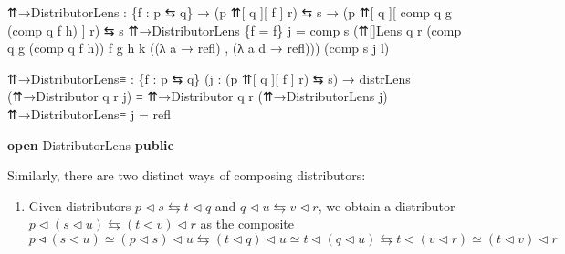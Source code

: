 \documentclass[
  11pt,
  oneside,
  article]{memoir}
\newenvironment{Shaded}{}{}
\newcommand{\KeywordTok}[1]{\textcolor[rgb]{0.00,0.44,0.13}{\textbf{#1}}}
\newcommand{\NormalTok}[1]{#1}
\newcommand{\OtherTok}[1]{\textcolor[rgb]{0.00,0.44,0.13}{#1}}
\providecommand{\tightlist}{%
  \setlength{\itemsep}{0pt}\setlength{\parskip}{0pt}}
\theoremstyle{definition}
\theoremstyle{plain}
\newcommand{\0}{\textsf{0}}
\newcommand{\1}{\tn{\textsf{1}}}
\begin{document}
\begin{Shaded}
\begin{Highlighting}[]
\NormalTok{    ⇈→DistributorLens }\OtherTok{:} \OtherTok{\{}\NormalTok{f }\OtherTok{:}\NormalTok{ p ⇆ q}\OtherTok{\}} \OtherTok{→} \OtherTok{(}\NormalTok{p ⇈[ q ][ f ] r}\OtherTok{)}\NormalTok{ ⇆ s }
                        \OtherTok{→} \OtherTok{(}\NormalTok{p\textquotesingle{} ⇈[ q\textquotesingle{} ][ comp q\textquotesingle{} g }\OtherTok{(}\NormalTok{comp q\textquotesingle{} f h}\OtherTok{)}\NormalTok{ ] r\textquotesingle{}}\OtherTok{)}\NormalTok{ ⇆ s\textquotesingle{}}
\NormalTok{    ⇈→DistributorLens }\OtherTok{\{}\NormalTok{f }\OtherTok{=}\NormalTok{ f}\OtherTok{\}}\NormalTok{ j }\OtherTok{=} 
\NormalTok{        comp s\textquotesingle{} }\OtherTok{(}\NormalTok{⇈[]Lens q\textquotesingle{} r }\OtherTok{(}\NormalTok{comp q\textquotesingle{} g }\OtherTok{(}\NormalTok{comp q\textquotesingle{} f h}\OtherTok{))}\NormalTok{ f }
\NormalTok{                         g h k }\OtherTok{((λ}\NormalTok{ a }\OtherTok{→}\NormalTok{ refl}\OtherTok{)}\NormalTok{ , }\OtherTok{(λ}\NormalTok{ a d }\OtherTok{→}\NormalTok{ refl}\OtherTok{)))} 
             \OtherTok{(}\NormalTok{comp s\textquotesingle{} j l}\OtherTok{)}

\NormalTok{    ⇈→DistributorLens≡ }\OtherTok{:} \OtherTok{\{}\NormalTok{f }\OtherTok{:}\NormalTok{ p ⇆ q}\OtherTok{\}} \OtherTok{(}\NormalTok{j }\OtherTok{:} \OtherTok{(}\NormalTok{p ⇈[ q ][ f ] r}\OtherTok{)}\NormalTok{ ⇆ s}\OtherTok{)}
                         \OtherTok{→}\NormalTok{ distrLens }\OtherTok{(}\NormalTok{⇈→Distributor q r j}\OtherTok{)} 
\NormalTok{                           ≡ ⇈→Distributor q\textquotesingle{} r\textquotesingle{} }\OtherTok{(}\NormalTok{⇈→DistributorLens j}\OtherTok{)}
\NormalTok{    ⇈→DistributorLens≡ j }\OtherTok{=}\NormalTok{ refl}

\KeywordTok{open}\NormalTok{ DistributorLens }\KeywordTok{public}
\end{Highlighting}
\end{Shaded}

Similarly, there are two distinct ways of composing distributors:

\begin{enumerate}
\def\labelenumi{\arabic{enumi}.}
\tightlist
\item
  Given distributors
  \(p \triangleleft s \leftrightarrows t \triangleleft q\) and
  \(q \triangleleft u \leftrightarrows v \triangleleft r\), we obtain a
  distributor
  \(p \triangleleft (s \triangleleft u) \leftrightarrows (t \triangleleft v) \triangleleft r\)
  as the composite \[
  p ◃ (s \triangleleft u) \simeq (p \triangleleft s) \triangleleft u \leftrightarrows (t \triangleleft q) \triangleleft u \simeq t \triangleleft (q \triangleleft u) \leftrightarrows t \triangleleft (v \triangleleft r) \simeq (t \triangleleft v) \triangleleft r
  \]
\end{enumerate}
\end{document}
